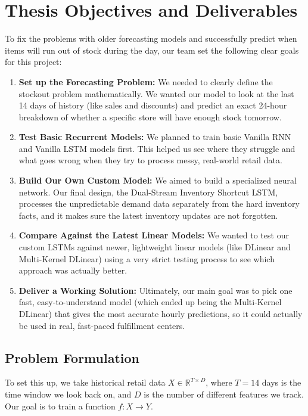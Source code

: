 \chapter{Thesis Objectives and Deliverables}
\label{chap:objectives}

To fix the problems with older forecasting models and successfully predict when items will run out of stock during the day, our team set the following clear goals for this project:

\begin{enumerate}
    \item \textbf{Set up the Forecasting Problem:} We needed to clearly define the stockout problem mathematically. We wanted our model to look at the last 14 days of history (like sales and discounts) and predict an exact 24-hour breakdown of whether a specific store will have enough stock tomorrow.
    \item \textbf{Test Basic Recurrent Models:} We planned to train basic Vanilla RNN and Vanilla LSTM models first. This helped us see where they struggle and what goes wrong when they try to process messy, real-world retail data.
    \item \textbf{Build Our Own Custom Model:} We aimed to build a specialized neural network. Our final design, the Dual-Stream Inventory Shortcut LSTM, processes the unpredictable demand data separately from the hard inventory facts, and it makes sure the latest inventory updates are not forgotten.
    \item \textbf{Compare Against the Latest Linear Models:} We wanted to test our custom LSTMs against newer, lightweight linear models (like DLinear and Multi-Kernel DLinear) using a very strict testing process to see which approach was actually better.
    \item \textbf{Deliver a Working Solution:} Ultimately, our main goal was to pick one fast, easy-to-understand model (which ended up being the Multi-Kernel DLinear) that gives the most accurate hourly predictions, so it could actually be used in real, fast-paced fulfillment centers.
\end{enumerate}

\section{Problem Formulation}

To set this up, we take historical retail data $X \in \mathbb{R}^{T \times D}$, where $T=14$ days is the time window we look back on, and $D$ is the number of different features we track. Our goal is to train a function $f: X \rightarrow Y$. 

